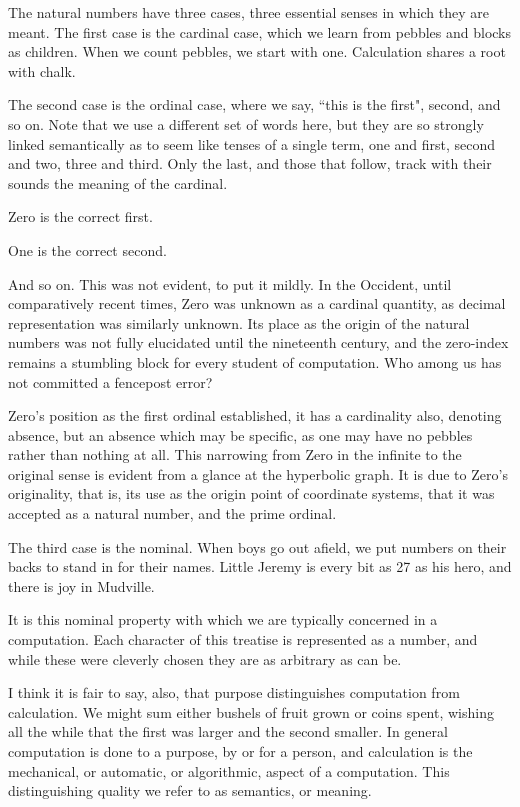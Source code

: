 \documentclass[twoside]{article}
\begin{document}
The natural numbers have three cases, three essential senses in which they are meant. The first case is the cardinal case, which we learn from pebbles and blocks as children. When we count pebbles, we start with one. Calculation shares a root with chalk.

The second case is the ordinal case, where we say, ``this is the first", second, and so on. Note that we use a different set of words here, but they are so strongly linked semantically as to seem like tenses of a single term, one and first, second and two, three and third. Only the last, and those that follow, track with their sounds the meaning of the cardinal.

Zero is the correct first.

One is the correct second.

And so on. This was not evident, to put it mildly. In the Occident, until comparatively recent times, Zero was unknown as a cardinal quantity, as decimal representation was similarly unknown. Its place as the origin of the natural numbers was not fully elucidated until the nineteenth century, and the zero-index remains a stumbling block for every student of computation. Who among us has not committed a fencepost error?

Zero's position as the first ordinal established, it has a cardinality also, denoting absence, but an absence which may be specific, as one may have no pebbles rather than nothing at all. This narrowing from Zero in the infinite to the original sense is evident from a glance at the hyperbolic graph. It is due to Zero's originality, that is, its use as the origin point of coordinate systems, that it was accepted as a natural number, and the prime ordinal.

The third case is the nominal. When boys go out afield, we put numbers on their backs to stand in for their names. Little Jeremy is every bit as 27 as his hero, and there is joy in Mudville.

It is this nominal property with which we are typically concerned in a computation. Each character of this treatise is represented as a number, and while these were cleverly chosen they are as arbitrary as can be.

I think it is fair to say, also, that purpose distinguishes computation from calculation. We might sum either bushels of fruit grown or coins spent, wishing all the while that the first was larger and the second smaller. In general computation is done to a purpose, by or for a person, and calculation is the mechanical, or automatic, or algorithmic, aspect of a computation. This distinguishing quality we refer to as semantics, or meaning.
\end{document}
